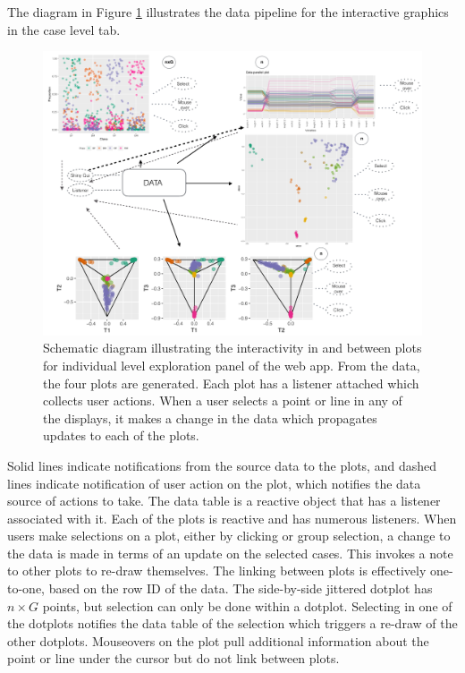 \documentclass[smallextended,natbib]{svjour3}\usepackage[]{graphicx}\usepackage[]{xcolor}
\begin{document}
The diagram in Figure \ref{tab1diag} illustrates the data pipeline \citep{BAHM88,wickham2009plumbing} for the interactive graphics in the case level tab. 
\begin{figure}[hbpt]
\centering
\includegraphics[width=1\linewidth]{fishT1.pdf}
\caption{Schematic diagram illustrating the interactivity in and between plots for individual level exploration panel of the web app. From the data, the four plots are generated. Each plot has a listener attached which collects user actions. When a user selects a point or line in any of the displays, it makes a change in the data which propagates updates to each of the plots.}
\label{tab1diag}
\end{figure}
Solid lines indicate notifications from the source data to the plots, and dashed lines indicate notification of user action on the plot, which notifies the data source of actions to take. The data table is a reactive object that has a listener associated with it. Each of the plots is reactive and has numerous listeners. When users make selections on a plot, either by clicking or group selection, a change to the data is made in terms of an update on the selected cases. This invokes a note to other plots to re-draw themselves. The linking between plots is effectively one-to-one, based on the row ID of the data. The side-by-side jittered dotplot has $n\times G$ points, but selection can only be done within a dotplot. Selecting in one of the dotplots notifies the data table of the selection which triggers a re-draw of the other dotplots. Mouseovers on the plot pull additional information about the point or line under the cursor but do not link between plots.
\end{document}
